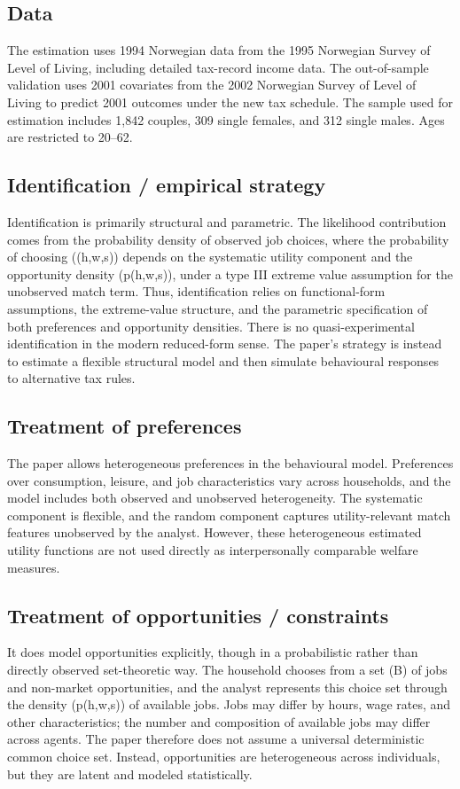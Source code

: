\documentclass[11pt,a4paper]{article}
\begin{document}
\subsection*{Data}
The estimation uses 1994 Norwegian data from the 1995 Norwegian Survey of Level of Living, including detailed tax-record income data. The out-of-sample validation uses 2001 covariates from the 2002 Norwegian Survey of Level of Living to predict 2001 outcomes under the new tax schedule. The sample used for estimation includes 1,842 couples, 309 single females, and 312 single males. Ages are restricted to 20–62.

\subsection*{Identification / empirical strategy}
Identification is primarily structural and parametric. The likelihood contribution comes from the probability density of observed job choices, where the probability of choosing ((h,w,s)) depends on the systematic utility component and the opportunity density (p(h,w,s)), under a type III extreme value assumption for the unobserved match term. Thus, identification relies on functional-form assumptions, the extreme-value structure, and the parametric specification of both preferences and opportunity densities. There is no quasi-experimental identification in the modern reduced-form sense. The paper’s strategy is instead to estimate a flexible structural model and then simulate behavioural responses to alternative tax rules.

\subsection*{Treatment of preferences}
The paper allows heterogeneous preferences in the behavioural model. Preferences over consumption, leisure, and job characteristics vary across households, and the model includes both observed and unobserved heterogeneity. The systematic component is flexible, and the random component captures utility-relevant match features unobserved by the analyst. However, these heterogeneous estimated utility functions are not used directly as interpersonally comparable welfare measures.

\subsection*{Treatment of opportunities / constraints}
It does model opportunities explicitly, though in a probabilistic rather than directly observed set-theoretic way. The household chooses from a set (B) of jobs and non-market opportunities, and the analyst represents this choice set through the density (p(h,w,s)) of available jobs. Jobs may differ by hours, wage rates, and other characteristics; the number and composition of available jobs may differ across agents. The paper therefore does not assume a universal deterministic common choice set. Instead, opportunities are heterogeneous across individuals, but they are latent and modeled statistically.
\end{document}
